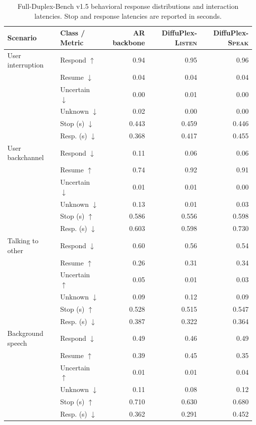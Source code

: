 \begin{table}[t]
\centering
\caption{
Full-Duplex-Bench v1.5 behavioral response distributions and interaction latencies.
Stop and response latencies are reported in seconds.
}
\label{atab:fdb_v15_behavior}
\small
\begin{tabular}{llrrr}
\toprule
Scenario & Class / Metric
& AR backbone
& DiffuPlex-\textsc{Listen}
& DiffuPlex-\textsc{Speak} \\
\midrule
User interruption
& Respond $\uparrow$     & 0.94  & 0.95  & 0.96 \\
& Resume $\downarrow$    & 0.04  & 0.04  & 0.04 \\
& Uncertain $\downarrow$ & 0.00  & 0.01  & 0.00 \\
& Unknown $\downarrow$   & 0.02  & 0.00  & 0.00 \\
& Stop (s) $\downarrow$  & 0.443 & 0.459 & 0.446 \\
& Resp. (s) $\downarrow$ & 0.368 & 0.417 & 0.455 \\
\midrule
User backchannel
& Respond $\downarrow$   & 0.11  & 0.06  & 0.06 \\
& Resume $\uparrow$      & 0.74  & 0.92  & 0.91 \\
& Uncertain $\downarrow$ & 0.01  & 0.01  & 0.00 \\
& Unknown $\downarrow$   & 0.13  & 0.01  & 0.03 \\
& Stop (s) $\uparrow$    & 0.586 & 0.556 & 0.598 \\
& Resp. (s) $\downarrow$ & 0.603 & 0.598 & 0.730 \\
\midrule
Talking to other
& Respond $\downarrow$   & 0.60  & 0.56  & 0.54 \\
& Resume $\uparrow$      & 0.26  & 0.31  & 0.34 \\
& Uncertain $\uparrow$   & 0.05  & 0.01  & 0.03 \\
& Unknown $\downarrow$   & 0.09  & 0.12  & 0.09 \\
& Stop (s) $\uparrow$    & 0.528 & 0.515 & 0.547 \\
& Resp. (s) $\downarrow$ & 0.387 & 0.322 & 0.364 \\
\midrule
Background speech
& Respond $\downarrow$   & 0.49  & 0.46  & 0.49 \\
& Resume $\uparrow$      & 0.39  & 0.45  & 0.35 \\
& Uncertain $\uparrow$   & 0.01  & 0.01  & 0.04 \\
& Unknown $\downarrow$   & 0.11  & 0.08  & 0.12 \\
& Stop (s) $\uparrow$    & 0.710 & 0.630 & 0.680 \\
& Resp. (s) $\downarrow$ & 0.362 & 0.291 & 0.452 \\
\bottomrule
\end{tabular}
\end{table}